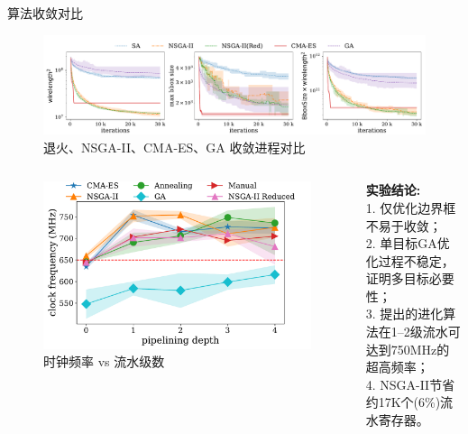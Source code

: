 \documentclass[10pt]{beamer}
\begin{document}
\begin{frame}{算法收敛对比}

  \begin{figure}
    \centering
    \includegraphics[width=\textwidth]{img/convergence.pdf}
    \caption{退火、NSGA-II、CMA-ES、GA 收敛进程对比}
  \end{figure}

  \vspace{-0.5cm}

  \begin{columns}[T, onlytextwidth]
    \begin{figure}
      \includegraphics[width=\textwidth]{img/frequency_depth}
      \caption{时钟频率 vs 流水级数}
    \end{figure}


  \vspace{0.3cm}
  
  {\fontsize{8}{12}\selectfont 
  {\bf 实验结论:}\\

  1. 仅优化边界框不易于收敛；\\
  2. 单目标GA优化过程不稳定，证明多目标必要性；\\
  3. 提出的进化算法在1--2级流水可达到750MHz的超高频率；\\
  4. NSGA-II节省约17K个(6\%)流水寄存器。
  }
  \end{columns}

\end{frame}
\end{document}
